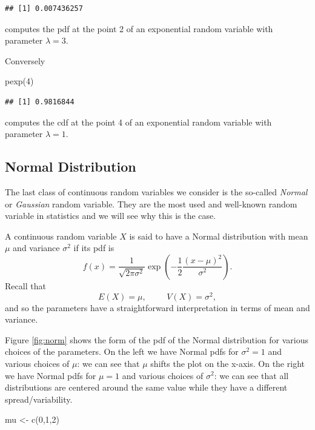 \documentclass[
]{book}
\newenvironment{Shaded}{\begin{snugshade}}{\end{snugshade}}
\newcommand{\DecValTok}[1]{\textcolor[rgb]{0.00,0.00,0.81}{#1}}
\newcommand{\FunctionTok}[1]{\textcolor[rgb]{0.00,0.00,0.00}{#1}}
\newcommand{\NormalTok}[1]{#1}
\newcommand{\OtherTok}[1]{\textcolor[rgb]{0.56,0.35,0.01}{#1}}
\theoremstyle{definition}
\theoremstyle{definition}
\theoremstyle{definition}
\theoremstyle{definition}
\theoremstyle{remark}
\begin{document}
\begin{verbatim}
## [1] 0.007436257
\end{verbatim}

computes the pdf at the point 2 of an exponential random variable with parameter \(\lambda =3\).

Conversely

\begin{Shaded}
\begin{Highlighting}[]
\FunctionTok{pexp}\NormalTok{(}\DecValTok{4}\NormalTok{)}
\end{Highlighting}
\end{Shaded}

\begin{verbatim}
## [1] 0.9816844
\end{verbatim}

computes the cdf at the point 4 of an exponential random variable with parameter \(\lambda =1\).

\hypertarget{normal-distribution}{%
\subsection{Normal Distribution}\label{normal-distribution}}

The last class of continuous random variables we consider is the so-called \emph{Normal} or \emph{Gaussian} random variable. They are the most used and well-known random variable in statistics and we will see why this is the case.

A continuous random variable \(X\) is said to have a Normal distribution with mean \(\mu\) and variance \(\sigma^2\) if its pdf is
\[
f(x) = \frac{1}{\sqrt{2\pi\sigma^2}}\exp\left(-\frac{1}{2}\frac{(x-\mu)^2}{\sigma^2}\right).
\]
Recall that
\[
E(X)=\mu, \hspace{1cm} V(X)=\sigma^2,
\]
and so the parameters have a straightforward interpretation in terms of mean and variance.

Figure \ref{fig:norm} shows the form of the pdf of the Normal distribution for various choices of the parameters. On the left we have Normal pdfs for \(\sigma^2=1\) and various choices of \(\mu\): we can see that \(\mu\) shifts the plot on the x-axis. On the right we have Normal pdfs for \(\mu=1\) and various choices of \(\sigma^2\): we can see that all distributions are centered around the same value while they have a different spread/variability.

\begin{Shaded}
\begin{Highlighting}[]
\NormalTok{mu }\OtherTok{\textless{}{-}} \FunctionTok{c}\NormalTok{(}\DecValTok{0}\NormalTok{,}\DecValTok{1}\NormalTok{,}\DecValTok{2}\NormalTok{)}
\end{Highlighting}
\end{Shaded}
\end{document}
